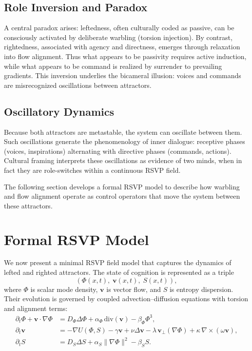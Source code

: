 \documentclass[a4paper,11pt]{article}
\begin{document}
\subsection{Role Inversion and Paradox}
A central paradox arises: leftedness, often culturally coded as passive, can be consciously activated by deliberate warbling (torsion injection). By contrast, rightedness, associated with agency and directness, emerges through relaxation into flow alignment. Thus what appears to be passivity requires active induction, while what appears to be command is realized by surrender to prevailing gradients. This inversion underlies the bicameral illusion: voices and commands are misrecognized oscillations between attractors.

\subsection{Oscillatory Dynamics}
Because both attractors are metastable, the system can oscillate between them. Such oscillations generate the phenomenology of inner dialogue: receptive phases (voices, inspirations) alternating with directive phases (commands, actions). Cultural framing interprets these oscillations as evidence of two minds, when in fact they are role-switches within a continuous RSVP field.

The following section develops a formal RSVP model to describe how warbling and flow alignment operate as control operators that move the system between these attractors.

\section{Formal RSVP Model}
\label{sec:formal-model}

We now present a minimal RSVP field model that captures the dynamics of lefted and righted attractors. The state of cognition is represented as a triple
\begin{equation}
(\Phi(x,t), \;\mathbf{v}(x,t), \;S(x,t)),
\end{equation}
where $\Phi$ is scalar mode density, $\mathbf{v}$ is vector flow, and $S$ is entropy dispersion. Their evolution is governed by coupled advection–diffusion equations with torsion and alignment terms:
\begin{align}
\partial_t \Phi + \mathbf{v}\cdot \nabla\Phi &= D_\Phi \Delta\Phi + \alpha_\Phi\,\mathrm{div}(\mathbf{v}) - \beta_\Phi \Phi^3, \label{eq:phi-main}\\[4pt]
\partial_t \mathbf{v} &= -\nabla U(\Phi,S) - \gamma \mathbf{v} + \nu \Delta \mathbf{v} 
- \lambda\,\mathbf{v}_\perp(\nabla\Phi) 
+ \kappa\, \nabla\times(\omega \mathbf{v}), \label{eq:v-main}\\[4pt]
\partial_t S &= D_S \Delta S + \alpha_S \|\nabla\Phi\|^2 - \beta_S S. \label{eq:S-main}
\end{align}
\end{document}
